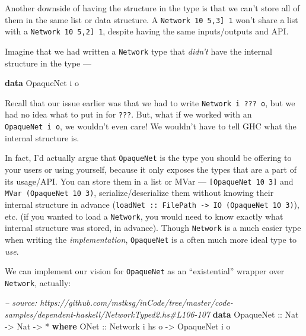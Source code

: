 \documentclass[]{article}
\newenvironment{Shaded}{}{}
\newcommand{\KeywordTok}[1]{\textcolor[rgb]{0.00,0.44,0.13}{\textbf{{#1}}}}
\newcommand{\DataTypeTok}[1]{\textcolor[rgb]{0.56,0.13,0.00}{{#1}}}
\newcommand{\CommentTok}[1]{\textcolor[rgb]{0.38,0.63,0.69}{\textit{{#1}}}}
\newcommand{\OtherTok}[1]{\textcolor[rgb]{0.00,0.44,0.13}{{#1}}}
\newcommand{\FunctionTok}[1]{\textcolor[rgb]{0.02,0.16,0.49}{{#1}}}
\newcommand{\NormalTok}[1]{{#1}}
\begin{document}
Another downside of having the structure in the type is that we can't store all
of them in the same list or data structure. A
\texttt{Network\ 10\ \textquotesingle{}{[}5,3{]}\ 1} won't share a list with a
\texttt{Network\ 10\ \textquotesingle{}{[}5,2{]}\ 1}, despite having the same
inputs/outputs and API.

Imagine that we had written a \texttt{Network} type that \emph{didn't} have the
internal structure in the type ---

\begin{Shaded}
\begin{Highlighting}[]
\KeywordTok{data} \DataTypeTok{OpaqueNet} \NormalTok{i o}
\end{Highlighting}
\end{Shaded}

Recall that our issue earlier was that we had to write
\texttt{Network\ i\ ???\ o}, but we had no idea what to put in for \texttt{???}.
But, what if we worked with an \texttt{OpaqueNet\ i\ o}, we wouldn't even care!
We wouldn't have to tell GHC what the internal structure is.

In fact, I'd actually argue that \texttt{OpaqueNet} is the type you should be
offering to your users or using yourself, because it only exposes the types that
are a part of its usage/API. You can store them in a list or MVar ---
\texttt{{[}OpaqueNet\ 10\ 3{]}} and \texttt{MVar\ (OpaqueNet\ 10\ 3)},
serialize/deserialize them without knowing their internal structure in advance
(\texttt{loadNet\ ::\ FilePath\ -\textgreater{}\ IO\ (OpaqueNet\ 10\ 3)}), etc.
(if you wanted to load a \texttt{Network}, you would need to know exactly what
internal structure was stored, in advance). Though \texttt{Network} is a much
easier type when writing the \emph{implementation}, \texttt{OpaqueNet} is a
often much more ideal type to \emph{use}.

We can implement our vision for \texttt{OpaqueNet} as an ``existential'' wrapper
over \texttt{Network}, actually:

\begin{Shaded}
\begin{Highlighting}[]
\CommentTok{-- source: https://github.com/mstksg/inCode/tree/master/code-samples/dependent-haskell/NetworkTyped2.hs#L106-107}
\KeywordTok{data} \DataTypeTok{OpaqueNet}\OtherTok{ ::} \DataTypeTok{Nat} \OtherTok{->} \DataTypeTok{Nat} \OtherTok{->} \FunctionTok{*} \KeywordTok{where}
    \DataTypeTok{ONet}\OtherTok{ ::} \DataTypeTok{Network} \NormalTok{i hs o }\OtherTok{->} \DataTypeTok{OpaqueNet} \NormalTok{i o}
\end{Highlighting}
\end{Shaded}
\end{document}
